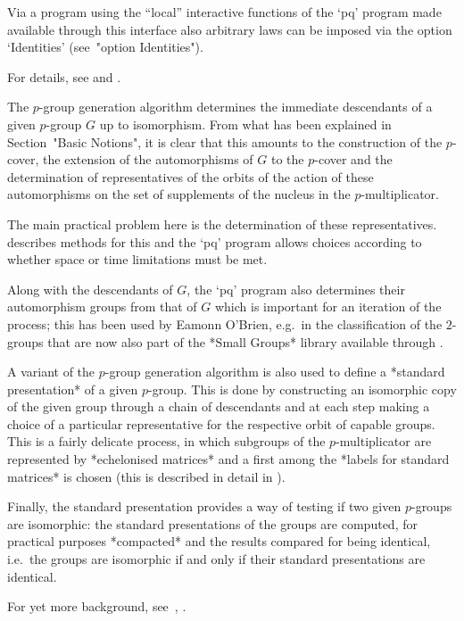 Via a  {\GAP} program using  the ``local'' interactive functions  of the
`pq' program made  available through this interface also  arbitrary laws can
be imposed via the option `Identities' (see~"option Identities").


For details, see \cite{New77} and \cite{OBr90}.

The  $p$-group generation  algorithm  determines the immediate  descendants of  a
given $p$-group $G$ up to isomorphism. From what has been explained in
Section~"Basic Notions", it is clear  that this amounts to the construction of
the  $p$-cover,  the  extension  of  the automorphisms  of  $G$  to  the
$p$-cover and  the determination of  representatives of the  orbits of
the action  of these  automorphisms on the  set of supplements  of the
nucleus in the $p$-multiplicator.

The  main  practical  problem  here  is  the  determination  of  these
representatives.  \cite{OBr90} describes methods  for this and the 
`pq' program allows choices according to  whether space or time limitations must
be met.

Along with  the descendants of $G$,  the `pq' program  also determines their
automorphism  groups  from  that  of  $G$ which  is  important  for  an
iteration of the  process; this has been  used by Eamonn O'Brien, e.g.~in the classification of the $2$-groups  that are now also part of the
*Small Groups* library available through {\GAP}.

A variant of the $p$-group generation algorithm is also used to define
a  *standard presentation*  of a  given  $p$-group.  This  is done  by
constructing an isomorphic copy of  the given group through a chain of
descendants  and  at  each  step  making  a  choice  of  a  particular
representative  for  the respective  orbit  of  capable groups.   This
is a fairly delicate  process, in which subgroups  of the $p$-multiplicator
are  represented  by *echelonised  matrices*  and  a  first among  the
*labels for  standard matrices* is  chosen (this is described in  detail in
\cite{OBr94}).

Finally, the  standard presentation  provides a way  of testing  if two
given  $p$-groups  are isomorphic:  the  standard presentations of the
groups are computed, for  practical purposes *compacted* and  the results
compared for being identical, i.e.~the groups are  isomorphic if and only if
their standard presentations are identical.

For yet more background, see~\cite{OBr95}, \cite{VL84}.



